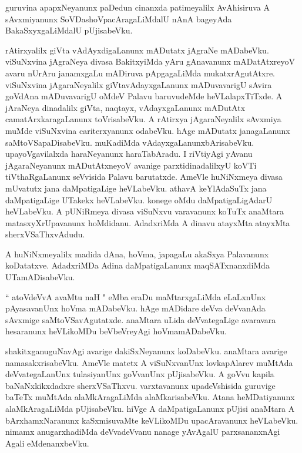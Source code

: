 \documentclass{article}
\begin{document}
\begin{mn}%
guruvina apapxNeyanunx paDedun cinanxda patimeyalilx AvAhisiruva A sAvxmiyanunx 
SoVDashoVpacAragaLiMdalU nAnA bageyAda BakaSxyxgaLiMdalU pUjisabeVku.
\end{mn}

\begin{mn}%
rAtirxyalilx giVta vAdAyxdigaLanunx mADutatx jAgraNe mADabeVku. viSuNxvina jAgraNeya divasa 
BakitxyiMda yAru gAnavanunx mADatAtxreyoV avaru nUrAru janamxgaLu mADiruva pApgagaLiMda 
mukatxrAgutAtxre. viSuNxvina jAgaraNeyalilx giVtavAdayxgaLanunx mADuvavarigU sAvira goVdAna 
mADuvavarigU oMdeV Palavu baruvudeMde heVLalapxTiTxde. A jAraNeya dinadalilx giVta, naqtayx, 
vAdayxgaLanunx  mADutAtx camatArxkaragaLanunx toVrisabeVku. A rAtirxya jAgaraNeyalilx sAvxmiya 
muMde viSuNxvina cariterxyanunx odabeVku. hAge mADutatx janagaLanunx saMtoVSapaDisabeVku. muKadiMda 
vAdayxgaLanunxbArisabeVku. upayoVgavilalxda haraNeyanunx haraTabAradu. I riVtiyAgi yAvanu 
jAgaraNeyanunx mADutAtxneyoV avanige parxtidinadalilxyU koVTi tiVthaRgaLanunx seVvisida Palavu 
barutatxde. AmeVle huNiNxmeya divasa mUvatutx jana daMpatigaLige heVLabeVku. athavA keYlAdaSuTx 
jana daMpatigaLige UTakekx heVLabeVku. konege oMdu daMpatigaLigAdarU heVLabeVku. A pUNiRmeya 
divasa viSuNxvu varavanunx koTuTx anaMtara matasxyXrUpavanunx hoMdidanu. AdadxriMda A dinavu 
atayxMta atayxMta sherxVSaThxvAdudu.
\end{mn}

\begin{mn}%
A huNiNxmeyalilx madida dAna, hoVma, japagaLu akaSxya Palavanunx koDatatxve. AdadxriMDa Adina 
daMpatigaLanunx maqSATxnanxdiMda UTamADisabeVku.
\end{mn}

\begin{mn}%
`` atoVdeVvA avaMtu naH " eMba eraDu maMtarxgaLiMda eLaLxnUnx pAyasavanUnx hoVma mADabeVku. hAge 
mADidare deVva deVvanAda sAvxmige saMtoVSavAgutatxde. anaMtara uLida deVvategaLige avaravara 
hesaranunx heVLikoMDu beVbeVreyAgi hoVmamADabeVku.
\end{mn}

\begin{mn}%
shakitxganuguNavAgi avarige dakiSxNeyanunx koDabeVku. anaMtara avarige namasakxrisabeVku. AmeVle 
matetx A viSuNxvanUnx lovkapAlarev muMtAda deVvategaLanUnx tulasiyanUnx goVvanUnx pUjisabeVku. A 
goVvu kapila baNaNxkikxdadxre sherxVSaThxvu. varxtavanunx upadeVshisida guruvige baTeTx muMtAda 
alaMkAragaLiMda alaMkarisabeVku. Atana heMDatiyanunx alaMkAragaLiMda pUjisabeVku. hiVge A 
daMpatigaLanunx pUjisi anaMtara A bArxhamxNaranunx kaSxmisuvaMte keVLikoMDu upacAravanunx 
heVLabeVku. nimamx anugarxhadiMda deVvadeVvanu nanage yAvAgalU parxsananxnAgi Agali eMdenanxbeVku.
\end{mn}
\end{document}
